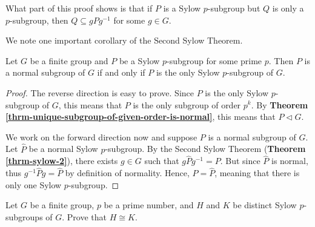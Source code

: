 \begin{remark}
    What part of this proof shows is that if $P$ is a Sylow $p$-subgroup but $Q$ is only a $p$-subgroup, then $Q \subseteq gPg^{-1}$ for some $g \in G$.
\end{remark}

We note one important corollary of the Second Sylow Theorem.
\begin{corollary-thrm}\label{corollary-sylow-subgroup-is-normal-if-it-is-unique}
    Let $G$ be a finite group and $P$ be a Sylow $p$-subgroup for some prime $p$. Then $P$ is a normal subgroup of $G$ if and only if $P$ is the only Sylow $p$-subgroup of $G$.
\end{corollary-thrm}
\begin{proof}
    The reverse direction is easy to prove. Since $P$ is the only Sylow $p$-subgroup of $G$, this means that $P$ is the only subgroup of order $p^k$. By \textbf{Theorem \ref{thrm-unique-subgroup-of-given-order-is-normal}}, this means that $P \lhd G$.

    We work on the forward direction now and suppose $P$ is a normal subgroup of $G$. Let $\hat{P}$ be a normal Sylow $p$-subgroup. By the Second Sylow Theorem (\textbf{Theorem \ref{thrm-sylow-2}}), there exists $g \in G$ such that $g\hat{P}g^{-1} = P$. But since $\hat{P}$ is normal, thus $g^{-1}\hat{P}g = \hat{P}$ by definition of normality. Hence, $P = \hat{P}$, meaning that there is only one Sylow $p$-subgroup.
\end{proof}

\begin{exercise}
    Let $G$ be a finite group, $p$ be a prime number, and $H$ and $K$ be distinct Sylow $p$-subgroups of $G$. Prove that $H \cong K$.
\end{exercise}

